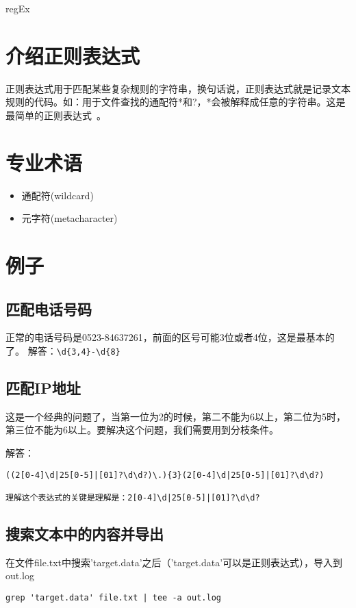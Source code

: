 \documentclass[a4paper,12pt]{ctexart}
\begin{document}
\begin{center}
\huge regEx
\end{center}
\normalsize

\section{介绍正则表达式}
正则表达式用于匹配某些复杂规则的字符串，换句话说，正则表达式就是记录文本规则的代码。如：用于文件查找的通配符*和?，*会被解释成任意的字符串。这是最简单的正则表达式~\cite{regEx入门}。


\section{专业术语}
\begin{itemize}
  \item 通配符(wildcard)
  \item 元字符(metacharacter)
\end{itemize}

\section{例子}
\subsection{匹配电话号码}
正常的电话号码是0523-84637261，前面的区号可能3位或者4位，这是最基本的了。
解答：\verb|\d{3,4}-\d{8}|
\subsection{匹配IP地址}
这是一个经典的问题了，当第一位为2的时候，第二不能为6以上，第二位为5时，第三位不能为6以上。要解决这个问题，我们需要用到分枝条件。

解答：
\begin{verbatim}
((2[0-4]\d|25[0-5]|[01]?\d\d?)\.){3}(2[0-4]\d|25[0-5]|[01]?\d\d?)

理解这个表达式的关键是理解是：2[0-4]\d|25[0-5]|[01]?\d\d?
\end{verbatim}

\subsection{搜索文本中的内容并导出}
在文件file.txt中搜索'target.data'之后（'target.data'可以是正则表达式），导入到out.log
\begin{verbatim}
grep 'target.data' file.txt | tee -a out.log
\end{verbatim}




%
%

%
\end{document}
